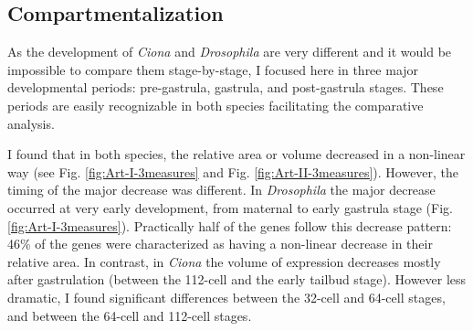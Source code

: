 \subsection{Compartmentalization}
%

As the development of \textit{Ciona} and \textit{Drosophila} are very different and it would be impossible to compare them stage-by-stage, I focused here in three major developmental periods: pre-gastrula, gastrula, and post-gastrula stages. These periods are easily recognizable in both species facilitating the comparative analysis.

I found that in both species, the relative area or volume decreased in a non-linear way (see Fig. \ref{fig:Art-I-3measures} and Fig. \ref{fig:Art-II-3measures}). 
However, the timing of the major decrease was different.
In \textit{Drosophila} the major decrease occurred at very early development, from maternal to early gastrula stage (Fig. \ref{fig:Art-I-3measures}).
Practically half of the genes follow this decrease pattern: 46\% of the genes were characterized as having a non-linear decrease in their relative area.
In contrast, in \textit{Ciona} the volume of expression decreases mostly after gastrulation (between the 112-cell and the early tailbud stage).
However less dramatic, I found significant differences between the 32-cell and 64-cell stages, and between the 64-cell and 112-cell stages.

